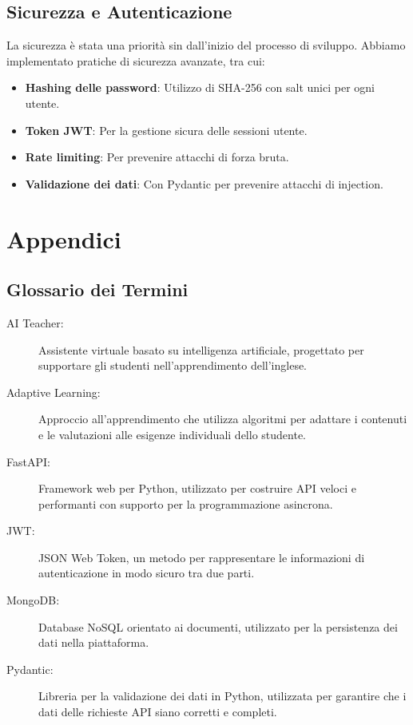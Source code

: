 \documentclass[a4paper, 14pt, oneside]{extbook}
\begin{document}
\section{Sicurezza e Autenticazione}

La sicurezza è stata una priorità sin dall'inizio del processo di sviluppo. Abbiamo implementato pratiche di sicurezza avanzate, tra cui:

\begin{itemize}
\item \textbf{Hashing delle password}: Utilizzo di SHA-256 con salt unici per ogni utente.
\item \textbf{Token JWT}: Per la gestione sicura delle sessioni utente.
\item \textbf{Rate limiting}: Per prevenire attacchi di forza bruta.
\item \textbf{Validazione dei dati}: Con Pydantic per prevenire attacchi di injection.
\end{itemize}

\chapter{Appendici}

\section{Glossario dei Termini}

\begin{description}
\item[AI Teacher:] Assistente virtuale basato su intelligenza artificiale, progettato per supportare gli studenti nell'apprendimento dell'inglese.
\item[Adaptive Learning:] Approccio all'apprendimento che utilizza algoritmi per adattare i contenuti e le valutazioni alle esigenze individuali dello studente.
\item[FastAPI:] Framework web per Python, utilizzato per costruire API veloci e performanti con supporto per la programmazione asincrona.
\item[JWT:] JSON Web Token, un metodo per rappresentare le informazioni di autenticazione in modo sicuro tra due parti.
\item[MongoDB:] Database NoSQL orientato ai documenti, utilizzato per la persistenza dei dati nella piattaforma.
\item[Pydantic:] Libreria per la validazione dei dati in Python, utilizzata per garantire che i dati delle richieste API siano corretti e completi.
\end{description}
\end{document}
